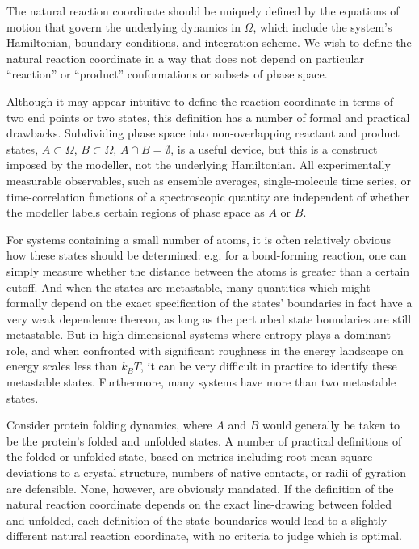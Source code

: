 \documentclass[aip, jcp, preprint, linenumbers, nofootinbib]{revtex4-1}
\begin{document}
The natural reaction coordinate should be uniquely defined by the equations of motion that govern the underlying dynamics in $\Omega$, which include the system's Hamiltonian, boundary conditions, and integration scheme. We wish to define the natural reaction coordinate in a way that does not depend on particular ``reaction'' or ``product'' conformations or subsets of phase space.

Although it may appear intuitive to define the reaction coordinate in terms of two end points or two states, this definition has a number of formal and practical drawbacks. Subdividing phase space into non-overlapping reactant and product states, $A \subset \Omega$, $B \subset \Omega$, $A \cap B = \emptyset$, is a useful device, but this is a construct imposed by the modeller, not the underlying Hamiltonian. All experimentally measurable observables, such as ensemble averages, single-molecule time series, or time-correlation functions of a spectroscopic quantity are independent of whether the modeller labels certain regions of phase space as $A$ or $B$.


For systems containing a small number of atoms, it is often relatively obvious how these states should be determined: e.g. for a bond-forming reaction, one can simply measure whether the distance between the atoms is greater than a certain cutoff. And when the states are metastable, many quantities which might formally depend on the exact specification of the states' boundaries in fact have a very weak dependence thereon, as long as the perturbed state boundaries are still metastable.\cite{hummer2004from} But in high-dimensional systems where entropy plays a dominant role, and when confronted with significant roughness in the energy landscape on energy scales less than $k_BT$, it can be very difficult in practice to identify these metastable states. Furthermore, many systems have more than two metastable states.

Consider protein folding dynamics, where $A$ and $B$ would generally be taken to be the protein's folded and unfolded states. A number of practical definitions of the folded or unfolded state, based on metrics including root-mean-square deviations to a crystal structure, numbers of native contacts, or radii of gyration are defensible. None, however, are obviously mandated. If the definition of the natural reaction coordinate depends on the exact line-drawing between folded and unfolded, each definition of the state boundaries would lead to a slightly different natural reaction coordinate, with no criteria to judge which is optimal.
\end{document}
